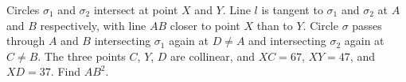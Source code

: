 Circles $\sigma_{1}$ and $\sigma_{2}$ intersect at point $X$ and $Y$. Line $l$ is tangent to $\sigma_{1}$ and $\sigma_{2}$ at $A$ and $B$ respectively, with line $AB$ closer to point $X$ than to $Y$. Circle $\sigma$ passes through $A$ and $B$ intersecting $\sigma_{1}$ again at $D \ne A$ and intersecting $\sigma_{2}$ again at $C \ne B$. The three points $C$, $Y$, $D$ are collinear, and $XC=67$, $XY=47$, and $XD=37$. Find $AB^{2}$.